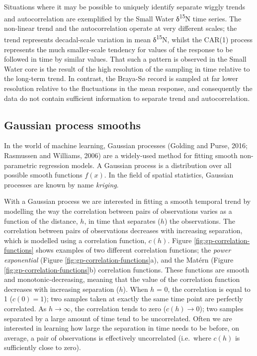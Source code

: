 \documentclass[12pt,]{article}
\begin{document}
Situations where it may be possible to uniquely identify separate wiggly
trends and autocorrelation are exemplified by the Small Water
δ\textsuperscript{15}N time series. The non-linear trend and the
autocorrelation operate at very different scales; the trend represents
decadal-scale variation in mean δ\textsuperscript{15}N, whilst the
CAR(1) process represents the much smaller-scale tendency for values of
the response to be followed in time by similar values. That such a
pattern is observed in the Small Water core is the result of the high
resolution of the sampling in time relative to the long-term trend. In
contrast, the Braya-Sø record is sampled at far lower resolution
relative to the fluctuations in the mean response, and consequently the
data do not contain sufficient information to separate trend and
autocorrelation.

\subsection{Gaussian process smooths}\label{gaussian-process-smooths}

In the world of machine learning, Gaussian processes (Golding and Purse,
2016; Rasmussen and Williams, 2006) are a widely-used method for fitting
smooth non-parametric regression models. A Gaussian process is a
distribution over all possible smooth functions \(f(x)\). In the field
of spatial statistics, Gaussian processes are known by name
\emph{kriging}.

With a Gaussian process we are interested in fitting a smooth temporal
trend by modelling the way the correlation between pairs of observations
varies as a function of the distance, \(h\), in time that separates
(\(h\)) the observations. The correlation between pairs of observations
decreases with increasing separation, which is modelled using a
correlation function, \(c(h)\). Figure
\ref{fig:gp-correlation-functions} shows examples of two different
correlation functions; the \emph{power exponential} (Figure
\ref{fig:gp-correlation-functions}a), and the Matérn (Figure
\ref{fig:gp-correlation-functions}b) correlation functions. These
functions are smooth and monotonic-decreasing, meaning that the value of
the correlation function decreases with increasing separation (\(h\)).
When \(h\) = 0, the correlation is equal to 1 (\(c(0) = 1\)); two
samples taken at exactly the same time point are perfectly correlated.
As \(h \rightarrow \infty\), the correlation tends to zero
(\(c(h) \rightarrow 0\)); two samples separated by a large amount of
time tend to be uncorrelated. Often we are interested in learning how
large the separation in time needs to be before, on average, a pair of
observations is effectively uncorrelated (i.e.~where \(c(h)\) is
sufficiently close to zero).
\end{document}
